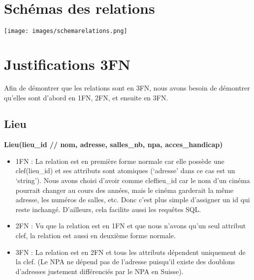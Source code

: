\documentclass[12pt]{article}
\begin{document}
\section{Schémas des relations}
\texttt{[image: images/schemarelations.png]}
\pagebreak
\section{Justifications 3FN}
Afin de démontrer que les relations sont en 3FN, 
nous avons besoin de démontrer qu'elles sont d'abord en 1FN, 2FN, et ensuite en 3FN.
\subsection{Lieu}
\textbf{Lieu(lieu{\_}id // nom, adresse, salles{\_}nb, npa, acces{\_}handicap)}
\begin{itemize}
    \item 1FN : La relation est en première forme normale car elle possède une clef(lieu{\_}id) 
    et ses attributs sont atomiques (‘adresse’ dans ce cas est un ‘string’). 
    Nous avons choisi d’avoir comme cleflieu{\_}id car le nom d’un cinéma pourrait 
    changer au cours des années, mais le cinéma garderait la même adresse, les numéros de salles, etc. 
    Donc c’est plus simple d’assigner un id qui reste inchangé. D’ailleurs, cela facilite aussi les requêtes SQL.
    \item 2FN : Vu que la relation est en 1FN et que nous n'avons qu'un seul attribut clef, la relation est aussi
    en deuxième forme normale.
    \item 3FN : La relation est en 2FN et tous les attributs dépendent uniquement de la clef. (Le NPA ne dépend pas de l'adresse
    puisqu'il existe des doublons d'adresses justement différenciés par le NPA en Suisse).
\end{itemize}
\end{document}
